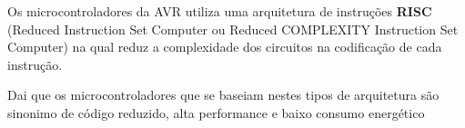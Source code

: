 \documentclass[titlepage, a4paper, 10pt, reqno, openany]{report}
\begin{document}
	Os microcontroladores da AVR utiliza uma arquitetura de instru\c{c}\~{o}es {\bf RISC} (Reduced Instruction Set Computer ou Reduced COMPLEXITY Instruction Set Computer) na qual reduz a complexidade dos circuitos na codifica\c{c}\~{a}o de cada instru\c{c}\~{a}o. \par
	Dai que os microcontroladores que se baseiam nestes tipos de arquitetura s\~{a}o sinonimo de c\'{o}digo reduzido, alta performance e baixo consumo energ\'{e}tico \par

\end{document}
